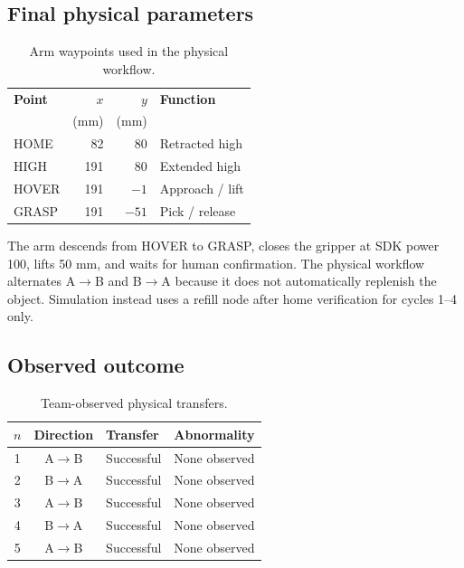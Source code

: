 \documentclass[9pt,a4paper,twocolumn,twoside]{tau-class/tau}
\begin{document}
\subsection{Final physical parameters}
\begin{table}[H]
\caption{Arm waypoints used in the physical workflow.}
\label{tab:waypoints}
\centering
\begin{tabular}{@{}lrrl@{}}
\toprule
\textbf{Point} & $x$ & $y$ & \textbf{Function}\\
 & (mm) & (mm) & \\
\midrule
HOME & 82 & 80 & Retracted high\\
HIGH & 191 & 80 & Extended high\\
HOVER & 191 & $-1$ & Approach / lift\\
GRASP & 191 & $-51$ & Pick / release\\
\bottomrule
\end{tabular}
\end{table}

The arm descends from HOVER to GRASP, closes the gripper at SDK power 100, lifts
50 mm, and waits for human confirmation. The physical workflow alternates
A$\rightarrow$B and B$\rightarrow$A because it does not automatically replenish
the object. Simulation instead uses a refill node after home verification for
cycles 1--4 only.

\subsection{Observed outcome}
\begin{table}[H]
\caption{Team-observed physical transfers.}
\label{tab:hardware}
\centering
\begin{tabular}{@{}ccll@{}}
\toprule
$n$ & \textbf{Direction} & \textbf{Transfer} & \textbf{Abnormality}\\
\midrule
1 & A$\rightarrow$B & Successful & None observed\\
2 & B$\rightarrow$A & Successful & None observed\\
3 & A$\rightarrow$B & Successful & None observed\\
4 & B$\rightarrow$A & Successful & None observed\\
5 & A$\rightarrow$B & Successful & None observed\\
\bottomrule
\end{tabular}
\end{table}
\end{document}
